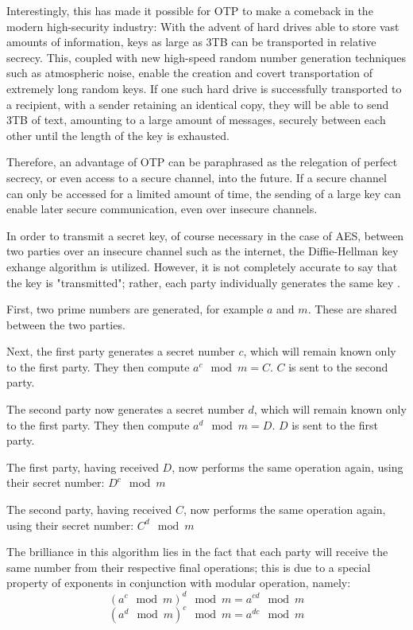 \documentclass[12pt, a4paper]{report}
\theoremstyle{definition}
\theoremstyle{remark}
\begin{document}
Interestingly, this has made it possible for OTP to make a comeback in the modern high-security industry: With the advent of hard drives able to store vast amounts of information, keys as large as 3TB can be transported in relative secrecy. This, coupled with new high-speed random number generation techniques such as atmospheric noise\cite{RandomOrg}, enable the creation and covert transportation of extremely long random keys. If one such hard drive is successfully transported to a recipient, with a sender retaining an identical copy, they will be able to send 3TB of text, amounting to a large amount of messages, securely between each other until the length of the key is exhausted.

Therefore, an advantage of OTP can be paraphrased as the relegation of perfect secrecy, or even access to a secure channel, into the future. If a secure channel can only be accessed for a limited amount of time, the sending of a large key can enable later secure communication, even over insecure channels.

In order to transmit a secret key, of course necessary in the case of AES, between two parties over an insecure channel such as the internet, the Diffie-Hellman key exhange algorithm is utilized. However, it is not completely accurate to say that the key is "transmitted"; rather, each party individually generates the same key \cite{DiffieHellman}.

First, two prime numbers are generated, for example $a$ and $m$. These are shared between the two parties.

Next, the first party generates a secret number $c$, which will remain known only to the first party. They then compute $a^c \mod m = C$. $C$ is sent to the second party.

The second party now generates a secret number $d$, which will remain known only to the first party. They then compute $a^d \mod m = D$. $D$ is sent to the first party.

The first party, having received $D$, now performs the same operation again, using their secret number:
$D^c \mod m$

The second party, having received $C$, now performs the same operation again, using their secret number:
$C^d \mod m$

The brilliance in this algorithm lies in the fact that each party will receive the same number from their respective final operations; this is due to a special property of exponents in conjunction with modular operation, namely:
\[
(a^c \mod m)^d \mod m = a^{cd} \mod m
\]
\[
(a^d \mod m)^c \mod m = a^{dc} \mod m
\]
\end{document}

